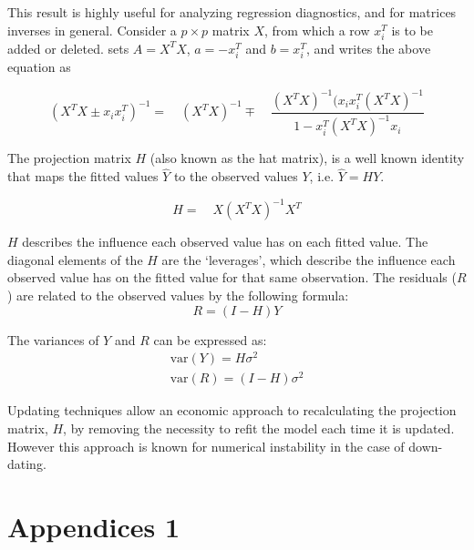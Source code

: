 \documentclass[12pt, a4paper]{report}
\theoremstyle{plain}
\theoremstyle{definition}
\theoremstyle{remark}
\begin{document}
	This result is highly useful for analyzing regression diagnostics,
	and for matrices inverses in general. Consider a $p \times p$
	matrix $X$, from which a row $x_{i}^{T}$ is to be added or
	deleted. \citet{CookWeisberg} sets $A = X^{T}X$, $a=-x_{i}^{T}$
	and $b=x_{i}^{T}$, and writes the above equation as
	
	\begin{equation}
	(X^{T}X \pm x_{i}x_{i}^{T})^{-1} = \quad(X^{T}X )^{-1} \mp \quad
	\frac{(X^{T}X)^{-1}(x_{i}x_{i}^{T}(X^{T}X)^{-1}}{1-x_{i}^{T}(X^{T}X)^{-1}x_{i}}
	\end{equation}
	
	The projection matrix $H$ (also known as the hat matrix), is a
	well known identity that maps the fitted values $\hat{Y}$ to the
	observed values $Y$, i.e. $\hat{Y} = HY$.
	
	\begin{equation}
	H =\quad X(X^{T}X)^{-1}X^{T}
	\end{equation}
	
	$H$ describes the influence each observed value has on each fitted value. The diagonal elements of the $H$ are the `leverages', which describe the influence each observed value has on the fitted value for that same observation. The residuals ($R$) are related to the observed values by the following formula:
	\begin{equation}
	R = (I-H)Y
	\end{equation}
	
	The variances of $Y$ and $R$ can be expressed as:
	\begin{eqnarray}
	\mbox{var}(Y) = H\sigma^{2} \nonumber\\
	\mbox{var}(R) = (I-H)\sigma^{2}
	\end{eqnarray}
	
	Updating techniques allow an economic approach to recalculating the projection matrix, $H$, by removing the necessity to refit the model each time it is updated. However this approach is known for
	numerical instability in the case of down-dating.
	
	
	
	\chapter{Appendices 1}
	
	
\end{document}

